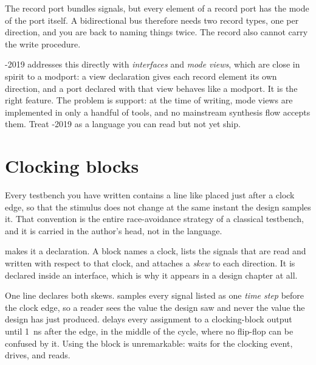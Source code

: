 The \VHDL{} record port bundles signals, but every element of a record port
has the mode of the port itself. A bidirectional bus therefore needs two
record types, one per direction, and you are back to naming things twice. The
record also cannot carry the write procedure.

\VHDL{}-2019 addresses this directly with \emph{interfaces} and \emph{mode
views}, which are close in spirit to a modport: a view
declaration gives each record element its own direction, and a port declared
with that view behaves like a modport. It is the right feature. The problem
is support: at the time of writing, mode views are implemented in only a
handful of tools, and no mainstream synthesis flow accepts them. Treat
\VHDL{}-2019 as a language you can read but not yet ship.

\section{Clocking blocks}
\label{sec:beyond:clocking}

Every \VHDL{} testbench you have written contains a line like
 placed just after a clock edge, so that the stimulus
does not change at the same instant the design samples it. That convention is
the entire race-avoidance strategy of a classical \VHDL{} testbench, and it is
carried in the author's head, not in the language.

\SV{} makes it a declaration. A  block names a clock, lists the
signals that are read and written with respect to that clock, and attaches a
\emph{skew} to each direction. It is declared inside an interface, which is
why it appears in a design chapter at all.


One line declares both skews.  samples every signal listed
as  one \emph{time step} before the clock edge, so a reader sees
the value the design saw and never the value the design has just produced.
 delays every assignment to a clocking-block output until
\SI{1}{\nano\second} after the edge, in the middle of the cycle, where no
flip-flop can be confused by it. Using the block is unremarkable:
 waits for the clocking event, 
drives, and  reads.

